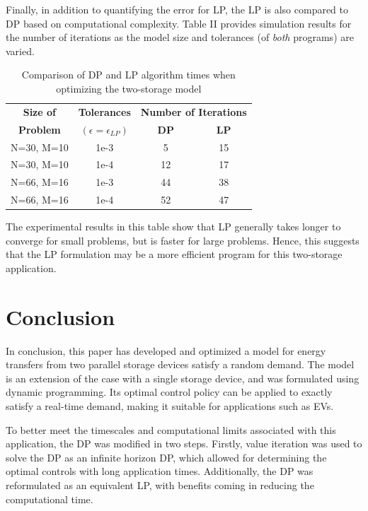 \documentclass[conference]{IEEEtran}
\begin{document}
Finally, in addition to quantifying the error for LP, the LP is also compared to DP based on computational complexity. Table II provides simulation results for the number of iterations as the model size and tolerances (of \textit{both} programs) are varied.

\begin{table}[htbp]
	\begin{center}
		\begin{tabular}{|c|c|c|c|}
			\hline
			\textbf{Size of}&\textbf{Tolerances}&\multicolumn{2}{|c|}{\textbf{Number of Iterations}} \\
			\cline{3-4} 
			\textbf{Problem} & \textbf{$(\epsilon=\epsilon_{LP})$} & \textbf{DP} &  \textbf{LP} \\
			\hline
			N=30, M=10& 1e-3 & 5 & 15 \\
			\hline
			N=30, M=10& 1e-4 & 12 & 17 \\
			\hline
			N=66, M=16& 1e-3 & 44 & 38 \\
			\hline
			N=66, M=16& 1e-4 & 52 & 47 \\
			\hline
		\end{tabular}
	\end{center}
	\label{tab:Table2}
	\caption{Comparison of DP and LP algorithm times when optimizing the two-storage model}
\end{table} The experimental results in this table show that LP generally takes longer to converge for small problems, but is faster for large problems. Hence, this suggests that the LP formulation may be a more efficient program for this two-storage application.


\section{Conclusion}
In conclusion, this paper has developed and optimized a model for energy transfers from two parallel storage devices satisfy a random demand. The model is an extension of the case with a single storage device, and was formulated using dynamic programming. Its optimal control policy can be applied to exactly satisfy a real-time demand, making it suitable for applications such as EVs.

To better meet the timescales and computational limits associated with this application, the DP was modified in two steps. Firstly, value iteration was used to solve the DP as an infinite horizon DP, which allowed for determining the optimal controls with long application times. Additionally, the DP was reformulated as an equivalent LP, with benefits coming in reducing the computational time. %
\end{document}
